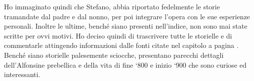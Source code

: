 \begin{figure}[hbt]%
	\vspace{-1cm}
    \centering
    \caption[Fedele e Natale Mingazzi]{}
	\vspace{-0.9cm}
\end{figure}

Ho immaginato quindi che Stefano, abbia riportato fedelmente le storie tramandate dal padre e dal nonno, per poi integrare l'opera con le sue esperienze personali.
Inoltre le ultime, benché siano presenti nell'indice, non sono mai state scritte per ovvi motivi. Ho deciso quindi di trascrivere tutte le storielle e di commentarle attingendo informazioni dalle fonti citate nel capitolo \textit{ }a pagina \pageref{fonti}.\\

Benché siano storielle palesemente sciocche, presentano parecchi dettagli dell'Alfonsine prebellica e della vita di fine `800 e inizio `900 che sono curiose ed interessanti.



